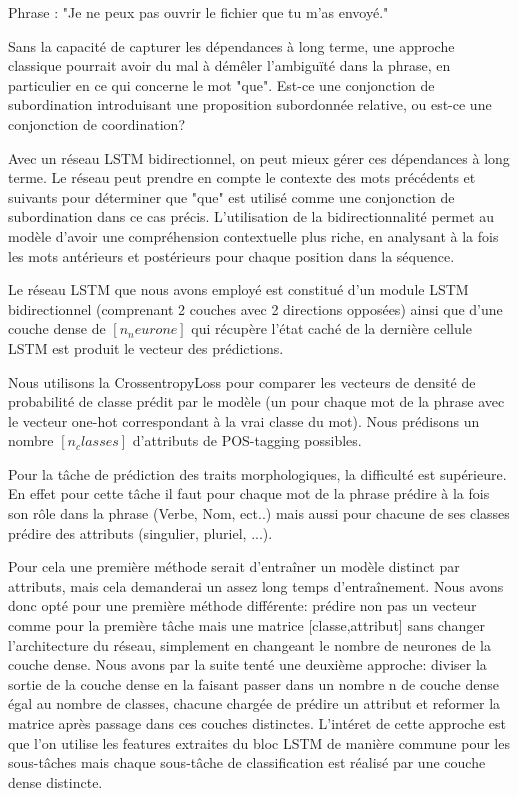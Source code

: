 \documentclass[a4paper]{article}
\begin{document}
Phrase : "Je ne peux pas ouvrir le fichier que tu m'as envoyé."

Sans la capacité de capturer les dépendances à long terme, une approche classique pourrait avoir du mal à démêler l'ambiguïté dans la phrase, en particulier en ce qui concerne le mot "que". Est-ce une conjonction de subordination introduisant une proposition subordonnée relative, ou est-ce une conjonction de coordination?

Avec un réseau LSTM bidirectionnel, on peut mieux gérer ces dépendances à long terme. Le réseau peut prendre en compte le contexte des mots précédents et suivants pour déterminer que "que" est utilisé comme une conjonction de subordination dans ce cas précis. L'utilisation de la bidirectionnalité permet au modèle d'avoir une compréhension contextuelle plus riche, en analysant à la fois les mots antérieurs et postérieurs pour chaque position dans la séquence. 

Le réseau LSTM que nous avons employé est constitué d'un module LSTM bidirectionnel (comprenant 2 couches avec 2 directions opposées) ainsi que d'une couche dense de $[n_neurone]$ qui récupère l'état caché de la dernière cellule LSTM est produit le vecteur des prédictions. 

Nous utilisons la CrossentropyLoss pour comparer les vecteurs de densité de probabilité de classe prédit par le modèle (un pour chaque mot de la phrase avec le vecteur one-hot correspondant à la vrai classe du mot). Nous prédisons un nombre $[n_classes]$ d'attributs de POS-tagging possibles. 


Pour la tâche de prédiction des traits morphologiques, la difficulté est supérieure. En effet pour cette tâche il faut pour chaque mot de la phrase prédire à la fois son rôle dans la phrase (Verbe, Nom, ect..) mais aussi pour chacune de ses classes prédire des attributs (singulier, pluriel, ...).

Pour cela une première méthode serait d'entraîner un modèle distinct par attributs, mais cela demanderai un assez long temps d'entraînement. Nous avons donc opté pour une première méthode différente: prédire non pas un vecteur comme pour la première tâche mais une matrice [classe,attribut] sans changer l'architecture du réseau, simplement en changeant le nombre de neurones de la couche dense. Nous avons par la suite tenté une deuxième approche: diviser la sortie de la couche dense en la faisant passer dans un nombre n de couche dense égal au nombre de classes, chacune chargée de prédire un attribut et reformer la matrice après passage dans ces couches distinctes. L'intéret de cette approche est que l'on utilise les features extraites du bloc LSTM de manière commune pour les sous-tâches mais chaque sous-tâche de classification est réalisé par une couche dense distincte.
\end{document}
